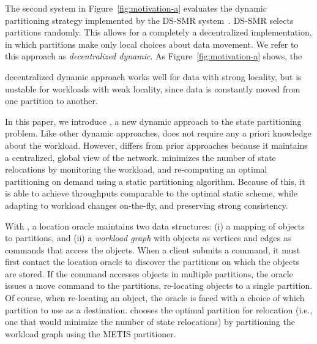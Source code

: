 The second system in Figure~\ref{fig:motivation-a} evaluates the dynamic
partitioning strategy implemented by the DS-SMR system~\cite{todo}.
DS-SMR selects partitions randomly. This allows for a completely a
decentralized implementation, in which partitions make only local
choices about data movement.  We refer to this approach as
\emph{decentralized dynamic}.  As Figure~\ref{fig:motivation-a} shows,
the {decentralized dynamic approach works well for data with strong
  locality, but is unstable for workloads with weak locality, since
  data is constantly moved from one partition to another.


In this paper, we introduce \dynastar, a new dynamic approach to the
state partitioning problem.  Like other dynamic approaches, \dynastar
does not require any a priori knowledge about the workload. However,
\dynastar differs from prior approaches because it maintains a
centralized, global view of the network.  \dynastar minimizes the
number of state relocations by monitoring the workload, and
re-computing an optimal partitioning on demand using a static
partitioning algorithm. Because of this, \dynastar it is able to
achieve throughputs comparable to the optimal static scheme, while
adapting to workload changes on-the-fly, and preserving strong
consistency.


With \dynastar, a location oracle maintains two data structures: (i) a
mapping of objects to partitions, and (ii) a \emph{workload graph}
with objects as vertices and edges as commands that access the
objects.  When a client submits a command, it must first contact the
location oracle to discover the partitions on which the objects are
stored.  If the command accesses objects in multiple partitions, the
oracle issues a move command to the partitions, re-locating objects to
a single partition. Of course, when re-locating an object, the oracle
is faced with a choice of which partition to use as a destination.
\dynastar chooses the optimal partition for relocation (i.e., one that
would minimize the number of state relocations) by partitioning the
workload graph using the METIS partitioner.

}
